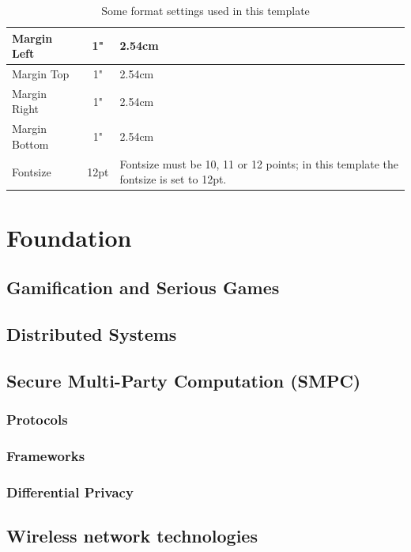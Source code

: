 \begin{center}
\begin{table}[h]
\caption[Format settings]{Some format settings used in this template}
	\begin{tabular}{| l | c | p{8cm} |}
		\hline
		Margin Left & 1" & 2.54cm \\[5pt] \hline
		Margin Top & 1" & 2.54cm \\ \hline
		Margin Right & 1" & 2.54cm \\ \hline
		Margin Bottom & 1" & 2.54cm \\ \hline
		Fontsize & 12pt & Fontsize must be 10, 11 or 12 points; in this template the fontsize is set to 12pt.  \\ \hline
	
	\end{tabular}
	
\end{table}
\end{center}
		
\par
\lipsum[1-3]

\chapter{Foundation}
	\section{Gamification and Serious Games}
	\section{Distributed Systems}
	\section{Secure Multi-Party Computation (SMPC)}
	\subsection*{Protocols}
	\subsection*{Frameworks}
	\subsection*{Differential Privacy}
	\section{Wireless network technologies}
